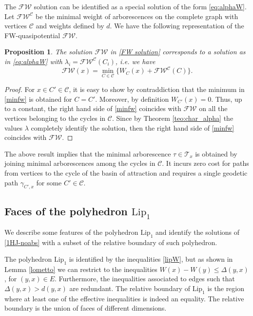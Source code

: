 \documentclass[reqno]{amsart}
\theoremstyle{plain}
\newtheorem{proposition}[theorem]{Proposition}
\theoremstyle{definition}
\theoremstyle{remark}
\numberwithin{equation}{section}
\numberwithin{theorem}{section}
\newcommand{\<}{\langle}
\renewcommand{\>}{\rangle}
\begin{document}
\smallskip

The $\mathscr{FW}$ solution can be identified as a special solution of the form \eqref{eq:alphaW}. Let $\mathscr{FW}^{\mathcal C}$ be the minimal weight of arborescences on the complete graph with vertices $\mathcal C$ and weights defined by $d$. We have the following representation of the FW-quasipotential $\mathscr{FW}$.
\begin{proposition}
	The solution $\mathscr{FW}$ in \eqref{FW solution} corresponds to a solution as in \eqref{eq:alphaW} with $\lambda_i=\mathscr{FW}^{\mathcal C}(C_i)$, i.e. we have
	\begin{equation}\label{minfw}  
		\mathscr{FW}(x) = \min_{C\in\mathcal C}\Big\{W_{C}(x)+\mathscr{FW}^{\mathcal C}(C)\Big\}.
	\end{equation}
\end{proposition}
\begin{proof}
	For $x \in C'\in \mathcal C$, it is easy to show by contraddiction that the minimum in \eqref{minfw} is obtained for $C=C'$. Moreover, by definition $W_{C'}(x)=0$. Thus, up to a constant, the right hand side of \eqref{minfw} coincides with $\mathscr{FW}$ on all the vertices belonging to the cycles in $\mathcal C$. Since by Theorem \ref{teo:char_alpha} the values $\lambda$ completely identify the solution, then the right hand side of \eqref{minfw} coincides with $\mathscr{FW}$.  
\end{proof}
The above result implies that the minimal arborescence $\tau\in \mathcal T_x$ is obtained by joining minimal arborescences among the cycles in $\mathcal C$. It incurs zero cost for paths from vertices to the cycle of the basin of attraction and requires a single geodetic path $\gamma_{C',x}$ for some $C'\in \mathcal C$.


\subsection{Faces of the polyhedron $\mathrm{Lip}_1$}
We describe some features of the polyhedron $\mathrm{Lip}_1$ and identify the solutions
of \eqref{1HJ-noabs} with a subset of the relative boundary of such polyhedron.

\smallskip

The polyhedron $\mathrm{Lip}_1$ is identified by the inequalities \eqref{lipW}, but as shown in Lemma \ref{lometto} we can restrict to the inequalities $W(x)-W(y)\leq \Delta (y,x)$, for $(y,x)\in E$. Furthermore, the inequalities associated to edges such that $\Delta(y,x)>d(y,x)$ are redundant. The relative boundary of $\mathrm{Lip}_1$ is the region where at least one of the effective inequalities is indeed an equality. The relative boundary is the union of faces of different dimensions. 
\end{document}
